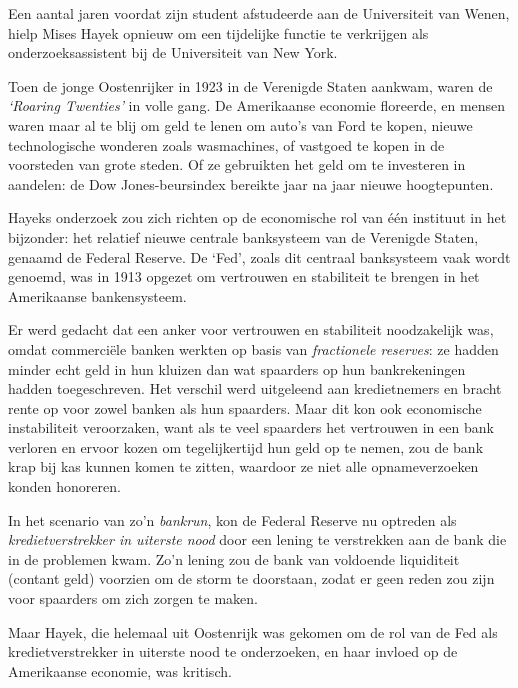 \documentclass[
  a5paper,
  smalldemyvopaper,11pt,twoside,onecolumn,openright,extrafontsizes]{memoir}
\begin{document}
Een aantal jaren voordat zijn student afstudeerde aan de Universiteit
van Wenen, hielp Mises Hayek opnieuw om een tijdelijke functie te
verkrijgen als onderzoeksassistent bij de Universiteit van New York.

Toen de jonge Oostenrijker in 1923 in de Verenigde Staten aankwam, waren
de \emph{`Roaring Twenties'} in volle gang. De Amerikaanse economie
floreerde, en mensen waren maar al te blij om geld te lenen om auto's
van Ford te kopen, nieuwe technologische wonderen zoals wasmachines, of
vastgoed te kopen in de voorsteden van grote steden. Of ze gebruikten
het geld om te investeren in aandelen: de Dow Jones-beursindex bereikte
jaar na jaar nieuwe hoogtepunten.

Hayeks onderzoek zou zich richten op de economische rol van één
instituut in het bijzonder: het relatief nieuwe centrale banksysteem van
de Verenigde Staten, genaamd de Federal Reserve. De `Fed', zoals dit
centraal banksysteem vaak wordt genoemd, was in 1913 opgezet om
vertrouwen en stabiliteit te brengen in het Amerikaanse bankensysteem.

Er werd gedacht dat een anker voor vertrouwen en stabiliteit
noodzakelijk was, omdat commerciële banken werkten op basis van
\emph{fractionele reserves}: ze hadden minder echt geld in hun kluizen
dan wat spaarders op hun bankrekeningen hadden toegeschreven. Het
verschil werd uitgeleend aan kredietnemers en bracht rente op voor zowel
banken als hun spaarders. Maar dit kon ook economische instabiliteit
veroorzaken, want als te veel spaarders het vertrouwen in een bank
verloren en ervoor kozen om tegelijkertijd hun geld op te nemen, zou de
bank krap bij kas kunnen komen te zitten, waardoor ze niet alle
opnameverzoeken konden honoreren.

In het scenario van zo'n \emph{bankrun}, kon de Federal Reserve nu
optreden als \emph{kredietverstrekker in uiterste nood} door een lening
te verstrekken aan de bank die in de problemen kwam. Zo'n lening zou de
bank van voldoende liquiditeit (contant geld) voorzien om de storm te
doorstaan, zodat er geen reden zou zijn voor spaarders om zich zorgen te
maken.

Maar Hayek, die helemaal uit Oostenrijk was gekomen om de rol van de Fed
als kredietverstrekker in uiterste nood te onderzoeken, en haar invloed
op de Amerikaanse economie, was kritisch.
\end{document}
